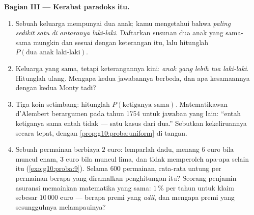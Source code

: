 \begin{problem}
\medskip
\noindent\textbf{Bagian III --- Kerabat paradoks itu.}
\begin{enumerate}[resume]
  \item Sebuah keluarga mempunyai dua anak; kamu mengetahui bahwa
        \emph{paling sedikit satu di antaranya laki-laki}. Daftarkan susunan
        dua anak yang sama-sama mungkin dan sesuai dengan keterangan itu, lalu
        hitunglah $P(\text{dua anak laki-laki})$.
  \item Keluarga yang sama, tetapi keterangannya kini: \emph{anak yang
        lebih tua laki-laki}. Hitunglah ulang. Mengapa kedua jawabannya
        berbeda, dan apa kesamaannya dengan kedua Monty tadi?
  \item Tiga koin setimbang: hitunglah $P(\text{ketiganya sama})$.
        Matematikawan d'Alembert berargumen pada tahun 1754 untuk jawaban
        yang lain: ``entah ketiganya sama entah tidak ---
        satu kasus dari dua.'' Sebutkan kekeliruannya secara tepat, dengan
        \cref{prop:g10:proba:uniform} di tangan.
  \item Sebuah permainan berbiaya $2$ euro: lemparlah dadu, menang $6$ euro
        bila muncul enam, $3$ euro bila muncul lima, dan tidak memperoleh
        apa-apa selain itu (\cref{exo:g10:proba:9}). Selama $600$ permainan,
        rata-rata untung per permainan berapa yang diramalkan penghitungan itu?
        Seorang penjamin asuransi memainkan matematika yang sama: 
        $1\,\%$ per tahun untuk klaim sebesar $10\,000$ euro --- berapa
        premi yang \emph{adil}, dan mengapa premi yang sesungguhnya
        melampauinya?
\end{enumerate}


\end{problem}
